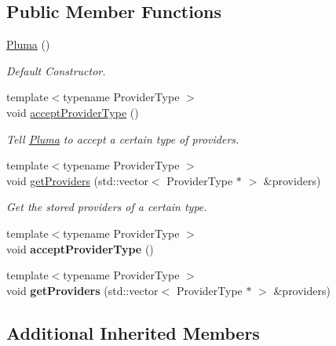 \subsection*{Public Member Functions}
\begin{DoxyCompactItemize}
\item 
\hyperlink{classpluma_1_1_pluma_adf4e065f5169931f6290f3828b49e7bb}{Pluma} ()
\begin{DoxyCompactList}\small\item\em Default Constructor. \end{DoxyCompactList}\item 
{\footnotesize template$<$typename Provider\+Type $>$ }\\void \hyperlink{classpluma_1_1_pluma_a200c59b0983c7ca53d11b03cf8220bc7}{accept\+Provider\+Type} ()
\begin{DoxyCompactList}\small\item\em Tell \hyperlink{classpluma_1_1_pluma}{Pluma} to accept a certain type of providers. \end{DoxyCompactList}\item 
{\footnotesize template$<$typename Provider\+Type $>$ }\\void \hyperlink{classpluma_1_1_pluma_a49fa0b2b4497885c4e978259be0a7abe}{get\+Providers} (std\+::vector$<$ Provider\+Type $\ast$ $>$ \&providers)
\begin{DoxyCompactList}\small\item\em Get the stored providers of a certain type. \end{DoxyCompactList}\item 
{\footnotesize template$<$typename Provider\+Type $>$ }\\void {\bfseries accept\+Provider\+Type} ()\hypertarget{classpluma_1_1_pluma_a200c59b0983c7ca53d11b03cf8220bc7}{}\label{classpluma_1_1_pluma_a200c59b0983c7ca53d11b03cf8220bc7}

\item 
{\footnotesize template$<$typename Provider\+Type $>$ }\\void {\bfseries get\+Providers} (std\+::vector$<$ Provider\+Type $\ast$ $>$ \&providers)\hypertarget{classpluma_1_1_pluma_a49fa0b2b4497885c4e978259be0a7abe}{}\label{classpluma_1_1_pluma_a49fa0b2b4497885c4e978259be0a7abe}

\end{DoxyCompactItemize}
\subsection*{Additional Inherited Members}


